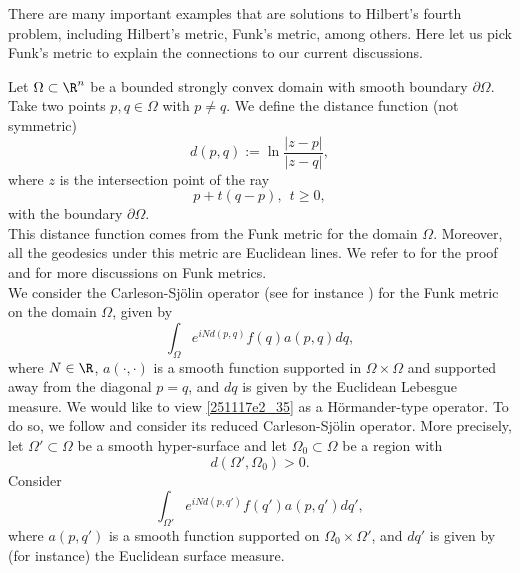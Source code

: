 \documentclass{article}
\numberwithin{equation}{section}
\theoremstyle{plain}
\begin{document}
There are many important examples that are solutions to Hilbert's fourth problem, including Hilbert's metric, Funk's metric, among others. Here let us pick Funk's metric to explain the connections to our current discussions. 




Let $\Omega\subset \R^n$ be a bounded strongly convex domain with smooth boundary $\partial \Omega$. Take two points $p, q\in \Omega$ with $p\neq q$. We define the distance function (not symmetric)
\begin{equation}
d(p, q):= \ln \frac{|z-p|}{|z-q|},
\end{equation}
where $z$ is the intersection point of the ray 
\begin{equation}
p+ t(q-p), \ \ t\ge 0,
\end{equation}
with the boundary $\partial \Omega$. \\


This distance function comes from the Funk metric for the domain $\Omega$. Moreover, all the geodesics under this metric are Euclidean lines.  We refer to \cite[Section 4.3]{Shen01} for the proof and for more discussions on Funk metrics. \\

We consider the Carleson-Sj\"olin operator (see for instance \cite[Section 1.3]{DGGZ24}) for the Funk metric on the domain $\Omega$, given by 
\begin{equation}\label{251117e2_35}
\int_{\Omega} e^{i N d(p, q)}f(q) a(p, q) dq,
\end{equation}
where $N\in \R$, $a(\cdot, \cdot)$ is a smooth function supported in $\Omega\times \Omega$ and supported away from the diagonal $p=q$, and $dq$ is given by the Euclidean Lebesgue measure. We would like to view \eqref{251117e2_35} as a H\"ormander-type operator. To do so, we follow \cite{DGGZ24} and consider its reduced Carleson-Sj\"olin operator. More precisely, let $\Omega'\subset \Omega$ be a smooth hyper-surface and let $\Omega_0\subset \Omega$ be a region with 
\begin{equation}
d(\Omega', \Omega_0)>0.
\end{equation}
Consider 
\begin{equation}\label{251117e2_36}
\int_{\Omega'} e^{i N d(p, q')}f(q') a(p, q') dq',
\end{equation}
where $a(p, q')$ is a smooth function supported on $\Omega_0\times \Omega'$, and $dq'$ is given by (for instance) the Euclidean surface measure. \\
\end{document}
